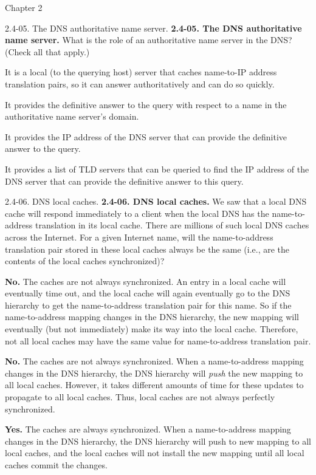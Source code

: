 \documentclass[a4paper]{article}
\begin{document}
\begin{quiz}{Chapter 2}
\begin{multi}[points=1,shuffle,multiple]{2.4-05. The DNS authoritative name server.}
\textbf{2.4-05. The DNS authoritative name server.} 
What is the role of an authoritative name server in the DNS? (Check all that apply.)
\item It is a local (to the querying host) server that caches name-to-IP address translation pairs, so it can answer authoritatively and can do so quickly.
\item* It provides the definitive answer to the query with respect to a name in the authoritative name server's domain.
\item It provides the IP address of the DNS server that can provide the definitive answer to the query.
\item It provides a list of TLD servers that can be queried to find the IP address of the DNS server that can provide the definitive answer to this query.
\end{multi}

\begin{multi}[points=1,shuffle]{2.4-06. DNS local caches.}
\textbf{2.4-06. DNS local caches.} 
We saw that a local DNS cache will respond immediately to a client when the local DNS has the name-to-address translation in its local cache. There are millions of such local DNS caches across the Internet. For a given Internet name, will the name-to-address translation pair stored in these local caches always be the same (i.e., are the contents of the local caches synchronized)?

\item* \textbf{No.} The caches are not always synchronized. An entry in a local cache will eventually time out, and the local cache will again eventually go to the DNS hierarchy to get the name-to-address translation pair for this name.  So if the name-to-address mapping changes in the DNS hierarchy, the new mapping will eventually (but not immediately) make its way into the local cache. Therefore, not all local caches may have the same value for name-to-address translation pair.
\item \textbf{No.} The caches are not always synchronized. When a name-to-address mapping changes in the DNS hierarchy, the DNS hierarchy will \emph{push} the new mapping to all local caches.  However,  it takes different amounts of time for these updates to propagate to all local caches. Thus, local caches are not always perfectly synchronized.
\item \textbf{Yes.} The caches are always synchronized.  When a name-to-address mapping changes in the DNS hierarchy, the DNS hierarchy will push to new mapping to all local caches, and the local caches will not install the new mapping until all local caches commit the changes.
\end{multi}


\end{quiz}
\end{document}
